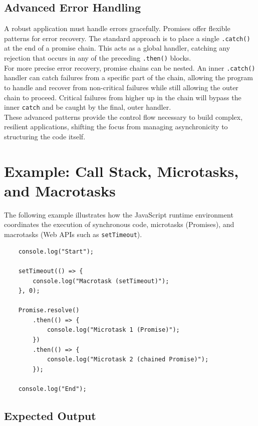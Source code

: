 \documentclass{scrbook}
\begin{document}
\subsection{Advanced Error Handling}

A robust application must handle errors gracefully. Promises offer flexible patterns for error recovery. The standard approach is to place a single \texttt{.catch()} at the end of a promise chain. This acts as a global handler, catching any rejection that occurs in any of the preceding \texttt{.then()} blocks. \\

For more precise error recovery, promise chains can be nested. An inner \texttt{.catch()} handler can catch failures from a specific part of the chain, allowing the program to handle and recover from non-critical failures while still allowing the outer chain to proceed. Critical failures from higher up in the chain will bypass the inner \texttt{catch} and be caught by the final, outer handler. \\

These advanced patterns provide the control flow necessary to build complex, resilient applications, shifting the focus from managing asynchronicity to structuring the code itself.

\section{Example: Call Stack, Microtasks, and Macrotasks}

The following example illustrates how the JavaScript runtime environment coordinates the execution of synchronous code, microtasks (Promises), and macrotasks (Web APIs such as \texttt{setTimeout}).

\begin{lstlisting}
    console.log("Start");
    
    setTimeout(() => {
        console.log("Macrotask (setTimeout)");
    }, 0);
    
    Promise.resolve()
        .then(() => {
            console.log("Microtask 1 (Promise)");
        })
        .then(() => {
            console.log("Microtask 2 (chained Promise)");
        });
    
    console.log("End");
\end{lstlisting}

\subsection{Expected Output}
\end{document}
